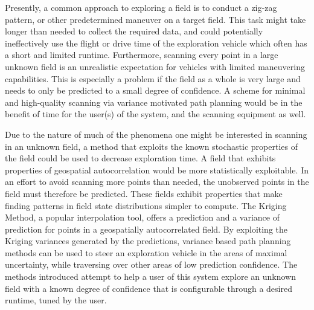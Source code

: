 Presently, a common approach to exploring a field is to conduct a zig-zag pattern, or other predetermined maneuver on a target field. This task might take longer than needed to collect the required data, and could potentially ineffectively use the flight or drive time of the exploration vehicle which often has a short and limited runtime. Furthermore, scanning every point in a large unknown field is an unrealistic expectation for vehicles with limited maneuvering capabilities. This is especially a problem if the field as a whole is very large and needs to only be predicted to a small degree of confidence. A scheme for minimal and high-quality scanning via variance motivated path planning would be in the benefit of time for the user(s) of the system, and the scanning equipment as well.

Due to the nature of much of the phenomena one might be interested in scanning in an unknown field, a method that exploits the known stochastic properties of the field could be used to decrease exploration time. A field that exhibits properties of geospatial autocorrelation would be more statistically exploitable. In an effort to avoid scanning more points than needed, the unobserved points in the field must therefore be predicted. These fields exhibit properties that make finding patterns in field state distributions simpler to compute. The Kriging Method, a popular interpolation tool, offers a prediction and a variance of prediction for points in a geospatially autocorrelated field. By exploiting the Kriging variances generated by the predictions, variance based path planning methods can be used to steer an exploration vehicle in the areas of maximal uncertainty, while traversing over other areas of low prediction confidence. The methods introduced attempt to help a user of this system explore an unknown field with a known degree of confidence that is configurable through a desired runtime, tuned by the user.



